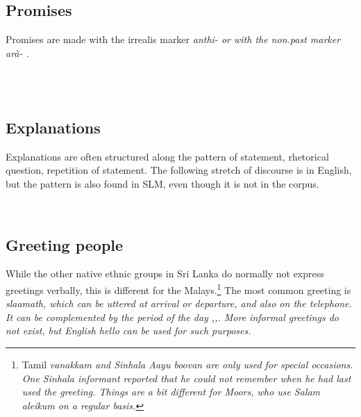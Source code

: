 \subsection{Promises}\label{sec:pragm:...promise}
Promises are made with the irrealis marker \em anthi- \em {} or with the non.past marker \em arà- \em {}.

 \\
 \\ 
\subsection{Explanations}\label{sec:pragm:...explain}
Explanations are often structured along the pattern of statement, rhetorical question, repetition of statement. The following stretch of discourse is in English, but the pattern is also found in SLM, even though it is not in the corpus.

 
 \\
\subsection{Greeting people}\label{sec:pragm:...greetpeople}
While the other native ethnic groups in Sri Lanka do normally not express greetings verbally, this is different for the Malays.\footnote{Tamil \em vanakkam \em and Sinhala \em Aayu boovan \em are only used for special occasions. One Sinhala informant reported that he could not remember when he had last used the greeting. Things are a bit different for Moors, who use \em Salam aleikum \em on a regular basis.}
The most common greeting is \em slaamath\em, which can be uttered at arrival or departure, and also on the telephone. It can be complemented by the period of the day ,,. More informal greetings do not exist, but English \em hello \em can be used for such purposes.

